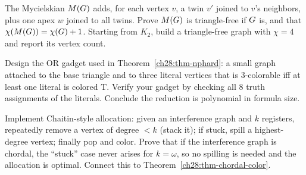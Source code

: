 \begin{exercise}
\label{ch28:ex-mycielski}
The Mycielskian $M(G)$ adds, for each vertex $v$, a twin $v'$ joined to $v$'s
neighbors, plus one apex $w$ joined to all twins. Prove $M(G)$ is triangle-free
if $G$ is, and that $\chi(M(G))=\chi(G)+1$. Starting from $K_2$, build a
triangle-free graph with $\chi=4$ and report its vertex count.
\end{exercise}

\begin{exercise}
\label{ch28:ex-gadget}
Design the OR gadget used in Theorem~\ref{ch28:thm-nphard}: a small graph attached to the
base triangle and to three literal vertices that is $3$-colorable iff at least one
literal is colored \textsf{T}. Verify your gadget by checking all $8$ truth
assignments of the literals. Conclude the reduction is polynomial in formula size.
\end{exercise}

\begin{exercise}
\label{ch28:ex-regalloc}
Implement Chaitin-style allocation: given an interference graph and $k$ registers,
repeatedly remove a vertex of degree $<k$ (stack it); if stuck, spill a
highest-degree vertex; finally pop and color. Prove that if the interference graph
is chordal, the ``stuck'' case never arises for $k=\omega$, so no spilling is needed
and the allocation is optimal. Connect this to Theorem~\ref{ch28:thm-chordal-color}.
\end{exercise}
